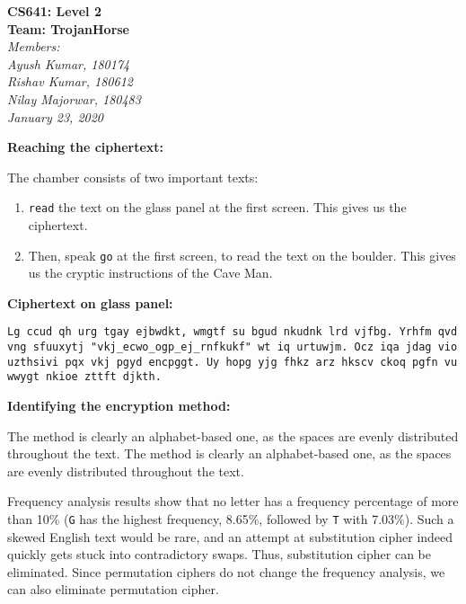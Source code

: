 \documentclass[11pt]{article}
\begin{document}
\begin{center}
  \Large\textbf{CS641: Level 2}\\
  \Large\textbf{Team: TrojanHorse}\\
  \medskip
  \large\textit{Members:\quad}\\
  \large\textit{Ayush Kumar, 180174\quad}\\
  \large\textit{Rishav Kumar, 180612\quad}\\
  \large\textit{Nilay Majorwar, 180483\quad}\\
  \medskip
  \large\textit{January 23, 2020\quad}
\end{center}

\bigskip
\bigskip

\textbf{Reaching the ciphertext: }
\medskip

The chamber consists of two important texts:
\begin{enumerate}
  \item \texttt{read} the text on the glass panel at the first screen. This gives us the ciphertext.
  \item Then, speak \texttt{go} at the first screen, to read the text on the boulder. This gives us the cryptic instructions of the Cave Man.
\end{enumerate}

\bigskip
\bigskip

\textbf{Ciphertext on glass panel: }

\begin{center}
  \texttt{Lg ccud qh urg tgay ejbwdkt, wmgtf su bgud nkudnk lrd vjfbg. Yrhfm qvd vng sfuuxytj "vkj\_ecwo\_ogp\_ej\_rnfkukf" wt iq urtuwjm. Ocz iqa jdag vio uzthsivi pqx vkj pgyd encpggt. Uy hopg yjg fhkz arz hkscv ckoq pgfn vu wwygt nkioe zttft djkth.}
\end{center}

\bigskip
\bigskip

\textbf{Identifying the encryption method: }
\medskip

The method is clearly an alphabet-based one, as the spaces are evenly distributed throughout the text. The method is clearly an alphabet-based one, as the spaces are evenly distributed throughout the text. 
\medskip

Frequency analysis results show that no letter has a frequency percentage of more than 10\% (\texttt{G} has the highest frequency, 8.65\%, followed by \texttt{T} with 7.03\%). Such a skewed English text would be rare, and an attempt at substitution cipher indeed quickly gets stuck into contradictory swaps. Thus, substitution cipher can be eliminated. Since permutation ciphers do not change the frequency analysis, we can also eliminate permutation cipher. 
\medskip
\end{document}
